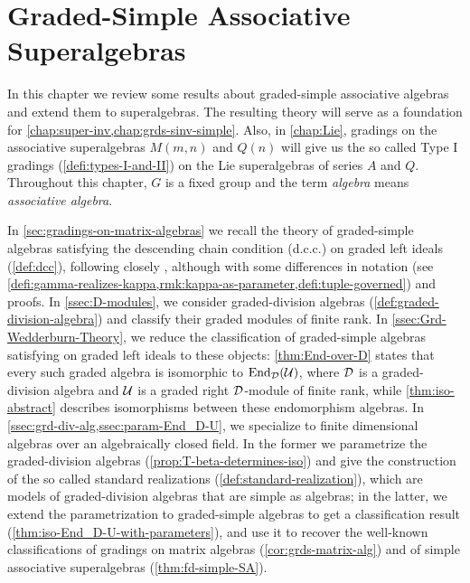\chapter{Graded-Simple Associative Superalgebras}\label{chap:grd-simple-assc}

In this chapter we review some results about graded-simple associative algebras and extend them to superalgebras. 
The resulting theory will serve as a foundation for \cref{chap:super-inv,chap:grds-sinv-simple}. 
Also, in \cref{chap:Lie}, gradings on the associative superalgebras $M(m,n)$ and $Q(n)$ will give us the so called Type I gradings (\cref{defi:types-I-and-II}) on the Lie superalgebras of series $A$ and $Q$.
Throughout this chapter, $G$ is a fixed group and the term \emph{algebra} means \emph{associative algebra}. 

In \cref{sec:gradings-on-matrix-algebras} we recall the theory of graded-simple algebras satisfying the descending chain condition (d.c.c.) on graded left ideals (\cref{def:dcc}), following closely \cite[Chapter 2]{livromicha}, although with some differences in notation (see \cref{defi:gamma-realizes-kappa,rmk:kappa-as-parameter,defi:tuple-governed}) and proofs. 
In \cref{ssec:D-modules}, we consider graded-division algebras (\cref{def:graded-division-algebra}) and classify their graded modules of finite rank. 
In \cref{ssec:Grd-Wedderburn-Theory}, we reduce the classification of graded-simple algebras satisfying \dcc on graded left ideals to these objects:  \cref{thm:End-over-D} states that every such graded algebra is isomorphic to $\operatorname{End}_{\mathcal{D}} (\mathcal U)$, where $\mathcal{D}$ is a graded-division algebra and $\mathcal U$ is a graded right $\mathcal{D}$-module of finite rank, while \cref{thm:iso-abstract} describes isomorphisms between these endomorphism algebras. 
In \cref{ssec:grd-div-alg,ssec:param-End_D-U}, we specialize to finite dimensional algebras over an algebraically closed field. 
In the former we parametrize the graded-division algebras (\cref{prop:T-beta-determines-iso})
and give the construction of the so called standard realizations (\cref{def:standard-realization}), which are models of graded-division algebras that are simple as algebras; in the latter, we extend the parametrization to graded-simple algebras to get a classification result (\cref{thm:iso-End_D-U-with-parameters}), and use it to recover the well-known classifications of gradings on matrix algebras (\cref{cor:grds-matrix-alg}) and of simple associative superalgebras (\cref{thm:fd-simple-SA}). 

